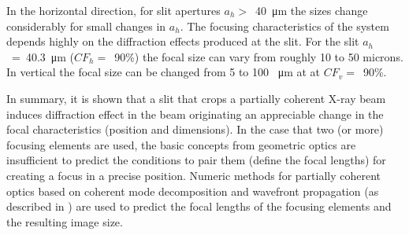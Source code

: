 \documentclass[9pt,twocolumn,twoside]{osajnl}
\begin{document}
In the horizontal direction, for slit apertures $a_h>$~\SI{40}{\micro\meter} the sizes change considerably for small changes in $a_h$. The focusing characteristics of the system depends highly on the diffraction effects produced at the slit. For the slit $a_h$~=~\SI{40.3}{\micro\meter} ($CF_h=$~90\%) the focal size can vary from roughly 10 to 50 microns.  In vertical the focal size can be changed from 5 to 100 \SI{}{\micro\meter} at at $CF_v=$~90\%.

In summary, it is shown that a slit that crops a partially coherent X-ray beam induces diffraction effect in the beam originating an appreciable change in the focal characteristics (position and dimensions). In the case that two (or more) focusing elements are used, the basic concepts from geometric optics are insufficient to predict the conditions to pair them (define the focal lengths) for creating a focus in a precise position. Numeric methods for partially coherent optics based on coherent mode decomposition and wavefront propagation (as described in \cite{delrio2021pairing}) are used to predict the focal lengths of the focusing elements and the resulting image size.   






\end{document}
